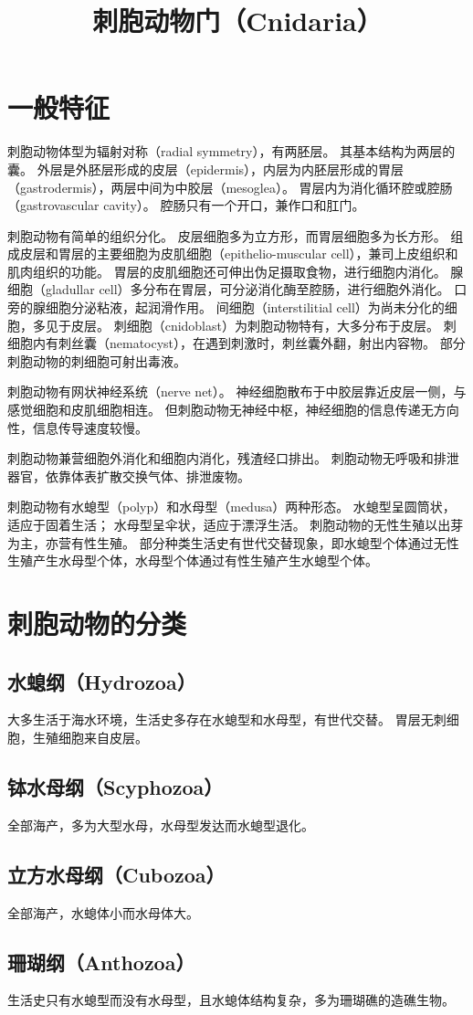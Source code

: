 \documentclass[11pt]{article}
\title{刺胞动物门（Cnidaria）}
\date{}
\begin{document}
  \maketitle

  \linenumbers
\section{一般特征}
刺胞动物体型为辐射对称（radial symmetry），有两胚层。
其基本结构为两层的囊。
外层是外胚层形成的皮层（epidermis），内层为内胚层形成的胃层（gastrodermis），两层中间为中胶层（mesoglea）。
胃层内为消化循环腔或腔肠（gastrovascular cavity）。
腔肠只有一个开口，兼作口和肛门。

\newline

刺胞动物有简单的组织分化。
皮层细胞多为立方形，而胃层细胞多为长方形。
组成皮层和胃层的主要细胞为皮肌细胞（epithelio-muscular cell），兼司上皮组织和肌肉组织的功能。
胃层的皮肌细胞还可伸出伪足摄取食物，进行细胞内消化。
腺细胞（gladullar cell）多分布在胃层，可分泌消化酶至腔肠，进行细胞外消化。
口旁的腺细胞分泌粘液，起润滑作用。
间细胞（interstilitial cell）为尚未分化的细胞，多见于皮层。
刺细胞（cnidoblast）为刺胞动物特有，大多分布于皮层。
刺细胞内有刺丝囊（nematocyst），在遇到刺激时，刺丝囊外翻，射出内容物。
部分刺胞动物的刺细胞可射出毒液。

\newline

刺胞动物有网状神经系统（nerve net）。
神经细胞散布于中胶层靠近皮层一侧，与感觉细胞和皮肌细胞相连。
但刺胞动物无神经中枢，神经细胞的信息传递无方向性，信息传导速度较慢。

\newline

刺胞动物兼营细胞外消化和细胞内消化，残渣经口排出。
刺胞动物无呼吸和排泄器官，依靠体表扩散交换气体、排泄废物。

\newline

刺胞动物有水螅型（polyp）和水母型（medusa）两种形态。
水螅型呈圆筒状，适应于固着生活；
水母型呈伞状，适应于漂浮生活。
刺胞动物的无性生殖以出芽为主，亦营有性生殖。
部分种类生活史有世代交替现象，即水螅型个体通过无性生殖产生水母型个体，水母型个体通过有性生殖产生水螅型个体。
  
\section{刺胞动物的分类}
\subsection{水螅纲（Hydrozoa）}
大多生活于海水环境，生活史多存在水螅型和水母型，有世代交替。
胃层无刺细胞，生殖细胞来自皮层。
  
\subsection{钵水母纲（Scyphozoa）}
全部海产，多为大型水母，水母型发达而水螅型退化。
  
\subsection{立方水母纲（Cubozoa）}
  全部海产，水螅体小而水母体大。
  
\subsection{珊瑚纲（Anthozoa）}
生活史只有水螅型而没有水母型，且水螅体结构复杂，多为珊瑚礁的造礁生物。  
  
\end{document}
